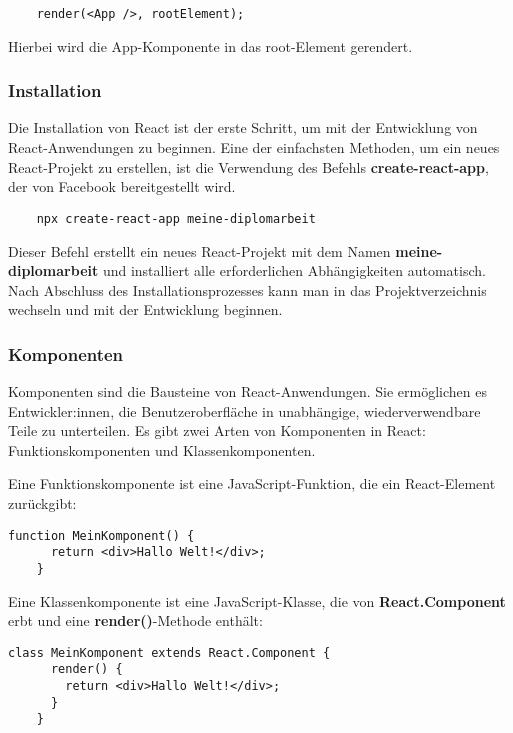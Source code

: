 \begin{lstlisting}
    render(<App />, rootElement);
\end{lstlisting}

Hierbei wird die App-Komponente in das root-Element gerendert.

\subsubsection{Installation}
Die Installation von React ist der erste Schritt, um mit der Entwicklung von React-Anwendungen zu beginnen. Eine der einfachsten Methoden, um ein neues React-Projekt zu erstellen, ist die Verwendung des Befehls \textbf{create-react-app}, der von Facebook bereitgestellt wird.

\begin{lstlisting}
    npx create-react-app meine-diplomarbeit
\end{lstlisting}

Dieser Befehl erstellt ein neues React-Projekt mit dem Namen \textbf{meine-diplomarbeit} und installiert alle erforderlichen Abhängigkeiten automatisch. Nach Abschluss des Installationsprozesses kann man in das Projektverzeichnis wechseln und mit der Entwicklung beginnen.

\cite{frontend_web_react_installation}

\subsubsection{Komponenten}
Komponenten sind die Bausteine von React-Anwendungen. Sie ermöglichen es Entwickler:innen, die Benutzeroberfläche in unabhängige, wiederverwendbare Teile zu unterteilen. Es gibt zwei Arten von Komponenten in React: Funktionskomponenten und Klassenkomponenten.

Eine Funktionskomponente ist eine JavaScript-Funktion, die ein React-Element zurückgibt:

\begin{lstlisting}[caption=Funktionskomponente]
    function MeinKomponent() {
      return <div>Hallo Welt!</div>;
    }
\end{lstlisting}
\newpage
Eine Klassenkomponente ist eine JavaScript-Klasse, die von \textbf{React.Component} erbt und eine \textbf{render()}-Methode enthält:

\begin{lstlisting}[caption=Klassenkomponente]
    class MeinKomponent extends React.Component {
      render() {
        return <div>Hallo Welt!</div>;
      }
    }
\end{lstlisting}

